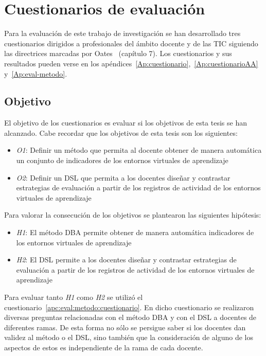 \section{Cuestionarios de evaluación}

	Para la evaluación de este trabajo de investigación se han desarrollado tres cuestionarios dirigidos a profesionales del ámbito docente y de las TIC siguiendo las directrices marcadas por Oates~\cite{oates2006researching} (capítulo 7). Los cuestionarios y sus resultados pueden verse en los apéndices~\ref{Ap:cuestionario},~\ref{Ap:cuestionarioAA} y~\ref{Ap:eval-metodo}. 


\subsection{Objetivo}

El objetivo de los cuestionarios es evaluar si los objetivos de esta tesis se han alcanzado. Cabe recordar que los objetivos de esta tesis son los siguientes:

\begin{itemize}
\item \emph{O1}: Definir un método que permita al docente obtener de manera automática un conjunto de indicadores de los entornos virtuales de aprendizaje
\item \emph{O2}: Definir un DSL que permita a los docentes diseñar y contrastar estrategias de evaluación a partir de los registros de actividad de los entornos virtuales de aprendizaje
\end{itemize}

Para valorar la consecución de los objetivos se plantearon las siguientes hipótesis:

\begin{itemize}
\item \emph{H1}: El método DBA permite obtener de manera automática indicadores de los entornos virtuales de aprendizaje
\item \emph{H2}: El DSL permite a los docentes diseñar y contrastar estrategias de evaluación a partir de los registros de actividad de los entornos virtuales de aprendizaje
\end{itemize}

Para evaluar tanto \emph{H1} como \emph{H2} se utilizó el cuestionario~\ref{apc:eval:metodo:cuestionario}. En dicho cuestionario se realizaron diversas preguntas relacionadas con el método DBA y con el DSL a docentes de diferentes ramas. De esta forma no sólo se persigue saber si los docentes dan validez al método o el DSL, sino también que la consideración de alguno de los aspectos de estos es independiente de la rama de cada docente.

